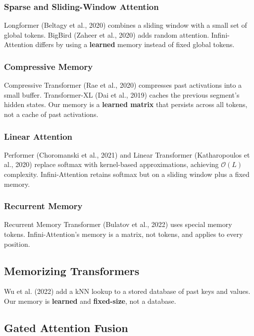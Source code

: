 \subsubsection{Sparse and Sliding-Window Attention}

Longformer (Beltagy et al., 2020) combines a sliding window with a small 
set of global tokens. BigBird (Zaheer et al., 2020) adds random attention. 
Infini-Attention differs by using a \textbf{learned} memory instead of fixed 
global tokens.

\subsubsection{Compressive Memory}

Compressive Transformer (Rae et al., 2020) compresses past activations into 
a small buffer. Transformer-XL (Dai et al., 2019) caches the previous 
segment's hidden states. Our memory is a \textbf{learned matrix} that persists 
across all tokens, not a cache of past activations.

\subsubsection{Linear Attention}

Performer (Choromanski et al., 2021) and Linear Transformer (Katharopoulos 
et al., 2020) replace softmax with kernel-based approximations, achieving 
$\mathcal{O}(L)$ complexity. Infini-Attention retains softmax but on a 
sliding window plus a fixed memory.

\subsubsection{Recurrent Memory}

Recurrent Memory Transformer (Bulatov et al., 2022) uses special memory 
tokens. Infini-Attention's memory is a matrix, not tokens, and applies to 
every position.

\subsection{Memorizing Transformers}

Wu et al. (2022) add a kNN lookup to a stored database of past keys and 
values. Our memory is \textbf{learned} and \textbf{fixed-size}, not a database.

\subsection{Gated Attention Fusion}

